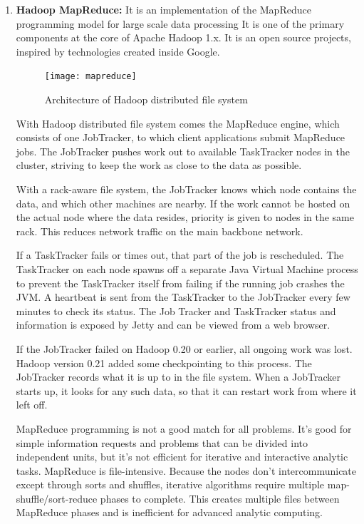 \documentclass[a4paper,12pt,oneside]{report}
\begin{document}
\begin{enumerate}
        \item \textbf{Hadoop MapReduce:}
                It is an implementation of the MapReduce programming model for large scale data processing
                It is one of the primary components at the core of Apache Hadoop 1.x. It is an open source projects, inspired by technologies created inside Google.
                \begin{figure}[h!]
                        \centering
                        \texttt{[image: mapreduce]}
                        \caption{Architecture of Hadoop distributed file system}
                \end{figure}
                With Hadoop distributed file system comes the MapReduce engine, which consists of one JobTracker, to which client applications submit MapReduce jobs.
                The JobTracker pushes work out to available TaskTracker nodes in the cluster, striving to keep the work as close to the data as possible.
                \par With a rack-aware file system, the JobTracker knows which node contains the data, and which other machines are nearby. If the work cannot be hosted on the actual node where the data resides, priority is given to nodes in the same rack. This reduces network traffic on the main backbone network.
                \par If a TaskTracker fails or times out, that part of the job is rescheduled. The TaskTracker on each node spawns off a separate Java Virtual Machine process to prevent the TaskTracker itself from failing if the running job crashes the JVM. A heartbeat is sent from the TaskTracker to the JobTracker every few minutes to check its status. The Job Tracker and TaskTracker status and information is exposed by Jetty and can be viewed from a web browser.
                \par If the JobTracker failed on Hadoop 0.20 or earlier, all ongoing work was lost. Hadoop version 0.21 added some checkpointing to this process. The JobTracker records what it is up to in the file system. When a JobTracker starts up, it looks for any such data, so that it can restart work from where it left off.
                \par MapReduce programming is not a good match for all problems. It’s good for simple information requests and problems that can be divided into independent units, but it's not efficient for iterative and interactive analytic tasks. MapReduce is file-intensive. Because the nodes don’t intercommunicate except through sorts and shuffles, iterative algorithms require multiple map-shuffle/sort-reduce phases to complete. This creates multiple files between MapReduce phases and is inefficient for advanced analytic computing.


\end{enumerate}
\end{document}
